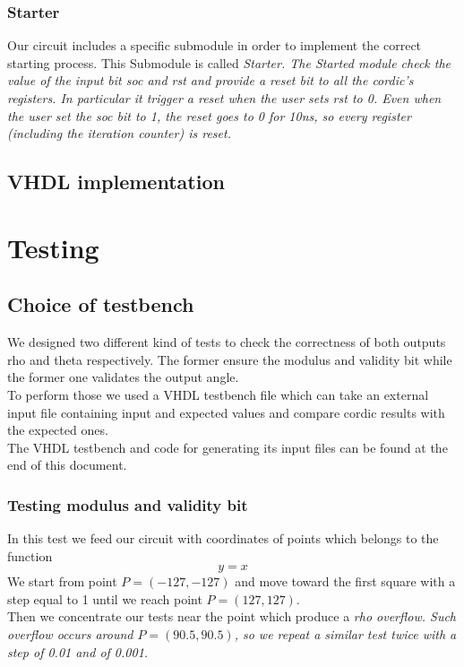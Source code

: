 \documentclass[12pt,a4paper]{report}
\begin{document}
\subsection{Starter}
Our circuit includes a specific submodule in order to implement the correct starting process. This Submodule is called \em{Starter}. The Started module check the value of the input bit soc and rst and provide a reset bit to all the cordic's registers. In particular it trigger a reset when the user sets rst to 0. Even when the user set the soc bit to 1, the reset goes to 0 for 10ns, so every register (including the iteration counter) is reset.


\section{VHDL implementation}




\chapter{Testing}

\section{Choice of testbench}
We designed two different kind of tests to check the correctness of both outputs rho and theta respectively.
The former ensure the modulus and validity bit while the former one validates the output angle.\\
To perform those we used a VHDL testbench file which can take an external input file containing input and expected values and compare cordic results with the expected ones.\\
The VHDL testbench and code for generating its input files can be found at the end of this document.

\subsection{Testing modulus and validity bit}
In this test we feed our circuit with coordinates of points which belongs to the function
	\begin{equation}
		y = x
  	\end{equation}
We start from point $P = \left(-127, -127\right)$ and move toward the first square with a step equal to 1 until we reach point $P=(127,127)$.\\
Then we concentrate our tests near the point which produce a \em{rho} overflow. Such overflow occurs around $P=(90.5,90.5)$, so we repeat a similar test twice with a step of 0.01 and of 0.001.
\end{document}
